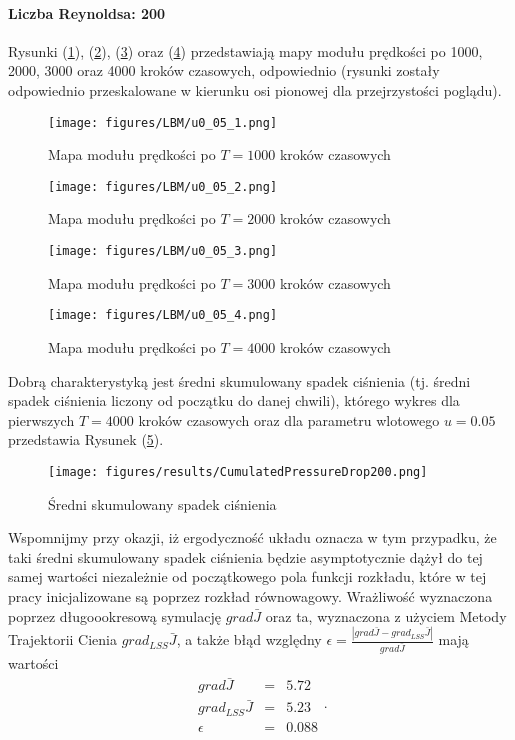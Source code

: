 \documentclass[12pt]{article}
\begin{document}
\paragraph{Liczba Reynoldsa: 200}
Rysunki (\ref{Fig31}), (\ref{Fig32}), (\ref{Fig33}) oraz (\ref{Fig34}) przedstawiają mapy modułu prędkości po 1000, 2000, 3000 oraz 4000 kroków czasowych, odpowiednio (rysunki zostały odpowiednio przeskalowane w kierunku osi pionowej dla przejrzystości poglądu).
\begin{figure}[H]
	\texttt{[image: figures/LBM/u0\_05\_1.png]} 
	\caption{Mapa modułu prędkości po $ T=1000 $ kroków czasowych}
	\label{Fig31}
\end{figure}
\begin{figure}[H]
	\texttt{[image: figures/LBM/u0\_05\_2.png]} 
	\caption{Mapa modułu prędkości po $ T=2000 $ kroków czasowych}
	\label{Fig32}
\end{figure}
\begin{figure}[H]
	\texttt{[image: figures/LBM/u0\_05\_3.png]} 
	\caption{Mapa modułu prędkości po $ T=3000 $ kroków czasowych}
	\label{Fig33}
\end{figure}
\begin{figure}[H]
	\texttt{[image: figures/LBM/u0\_05\_4.png]} 
	\caption{Mapa modułu prędkości po $ T=4000 $ kroków czasowych}
	\label{Fig34}
\end{figure}
Dobrą charakterystyką jest średni skumulowany spadek ciśnienia (tj. średni spadek ciśnienia liczony od początku do danej chwili), którego wykres dla pierwszych $ T = 4000 $  kroków czasowych oraz dla parametru wlotowego $ u=0.05 $ przedstawia Rysunek (\ref{Fig35}).
\begin{figure}[H]
	\texttt{[image: figures/results/CumulatedPressureDrop200.png]} 
	\centering
	\caption{Średni skumulowany spadek ciśnienia}
	\label{Fig35}
\end{figure}
Wspomnijmy przy okazji, iż ergodyczność układu oznacza w tym przypadku, że taki średni skumulowany spadek ciśnienia będzie asymptotycznie dążył do tej samej wartości niezależnie od początkowego pola funkcji rozkładu, które w tej pracy inicjalizowane są poprzez rozkład równowagowy.\newline
Wrażliwość wyznaczona poprzez długoookresową symulację $ grad\bar{J} $ oraz ta, wyznaczona z użyciem Metody Trajektorii Cienia $ grad_{LSS}\bar{J} $, a także błąd względny $ \epsilon = \frac{|grad\bar{J}-grad_{LSS}\bar{J}|}{grad\bar{J}}$ mają wartości
\begin{equation}
\begin{array}{rcl}
grad\bar{J} &=& 5.72\\
grad_{LSS}\bar{J} &=& 5.23 \\
\epsilon &=& 0.088
\end{array} .
\label{result200}
\end{equation}
\end{document}
